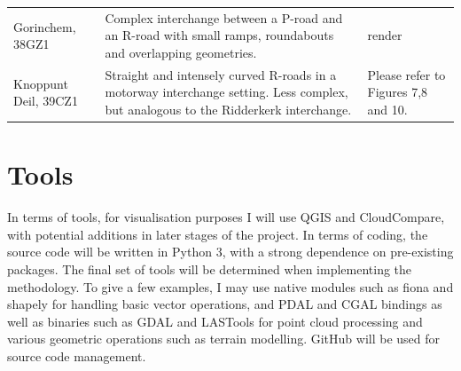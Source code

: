 \begin{longtable}[c]{@{}p{2.6cm}p{7cm}p{6cm}@{}}
Gorinchem, 38GZ1 & Complex interchange between a P-road and an R-road with small ramps, roundabouts and overlapping geometries. & render \\
Knoppunt Deil, 39CZ1 & Straight and intensely curved R-roads in a motorway interchange setting. Less complex, but analogous to the Ridderkerk interchange. & Please refer to Figures 7,8 and 10.
\end{longtable}

\section*{Tools}

In terms of tools, for visualisation purposes I will use QGIS and CloudCompare, with potential additions in later stages of the project. In terms of coding, the source code will be written in Python 3, with a strong dependence on pre-existing packages. The final set of tools will be determined when implementing the methodology. To give a few examples, I may use native modules such as fiona and shapely for handling basic vector operations, and PDAL and CGAL bindings as well as binaries such as GDAL and LASTools for point cloud processing and various geometric operations such as terrain modelling. GitHub will be used for source code management.